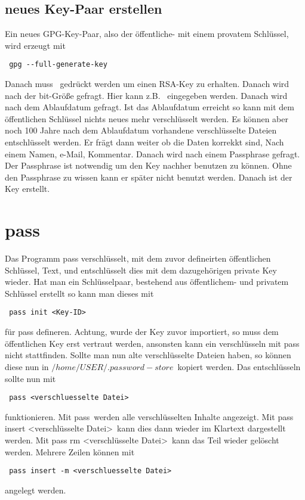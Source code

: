 \documentclass[11pt,fleqn]{book} %
\numberwithin{equation}{section} %
\numberwithin{figure}{section} %
\numberwithin{table}{section} %
\begin{document}
\subsection{neues Key-Paar erstellen}
Ein neues GPG-Key-Paar, also der öffentliche- mit einem provatem Schlüssel, wird erzeugt mit
\begin{lstlisting}
 gpg --full-generate-key
\end{lstlisting}
Danach muss \grqq \ gedrückt werden um einen RSA-Key zu erhalten. Danach wird nach der bit-Größe gefragt. Hier kann z.B. \grqq \ eingegeben werden. Danach wird nach dem Ablaufdatum gefragt. Ist das Ablaufdatum erreicht so kann mit dem öffentlichen Schlüssel nichts neues mehr verschlüsselt werden. Es können aber noch 100 Jahre nach dem Ablaufdatum vorhandene verschlüsselte Dateien entschlüsselt werden. Er frägt dann weiter ob die Daten korrekkt sind, Nach einem Namen, e-Mail, Kommentar. Danach wird nach einem Passphrase gefragt. Der Passphrase ist notwendig um den Key nachher benutzen zu können. Ohne den Passphrase zu wissen kann er später nicht benutzt werden. Danach ist der Key erstellt.
\section{pass}
Das Programm pass verschlüsselt, mit dem zuvor defineirten öffentlichen Schlüssel, Text, und entschlüsselt dies mit dem dazugehörigen private Key wieder. Hat man ein Schlüsselpaar, bestehend aus öffentlichem- und privatem Schlüssel erstellt so kann man dieses mit
\begin{lstlisting}
 pass init <Key-ID>
\end{lstlisting}
für pass defineren. Achtung, wurde der Key zuvor importiert, so muss dem öffentlichen Key erst vertraut werden, ansonsten kann ein verschlüsseln mit pass nicht stattfinden. Sollte man nun alte verschlüsselte Dateien haben, so können diese nun in \glqq$/home/USER/.password-store$\grqq \ kopiert werden. Das entschlüsseln sollte nun mit
\begin{lstlisting}
 pass <verschluesselte Datei>
\end{lstlisting}
funktionieren. Mit \glqq pass\grqq \ werden alle verschlüsselten Inhalte angezeigt. Mit \glqq pass insert <verschlüsselte Datei>\grqq \ kann dies dann wieder im Klartext dargestellt werden. Mit \glqq pass rm <verschlüsselte Datei>\grqq \ kann das Teil wieder gelöscht werden. Mehrere Zeilen können mit
\begin{lstlisting}
 pass insert -m <verschluesselte Datei>
\end{lstlisting}
angelegt werden.
\end{document}
